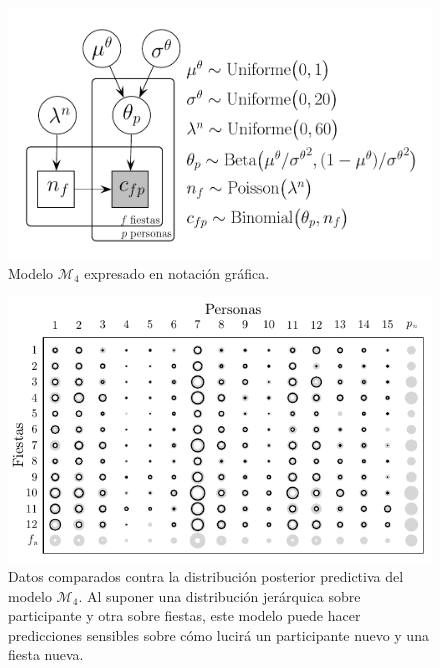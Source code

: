 \documentclass{article}
\begin{document}
\begin{figure}[H]
\centerline{\includegraphics[width=1\textwidth]{m_4.pdf}}
\caption{Modelo $\mathcal M_4$ expresado en notación gráfica.}
\label{fig:m_4}
\end{figure}

\begin{figure}[H]
\centering
\setlength\fboxsep{0pt}
\setlength\fboxrule{0.5pt}
\includegraphics[trim=0cm 0cm 0cm 0cm, clip=true, width=1\textwidth]	{data_pos_pred_m4.pdf}
\caption{Datos comparados contra la distribución posterior predictiva del modelo $\mathcal M_4$. Al suponer una distribución jerárquica sobre participante y otra sobre fiestas, este modelo puede hacer predicciones sensibles sobre cómo lucirá un participante nuevo y una fiesta nueva.}
\label{fig:data_4}
\end{figure}
	
\end{document}
